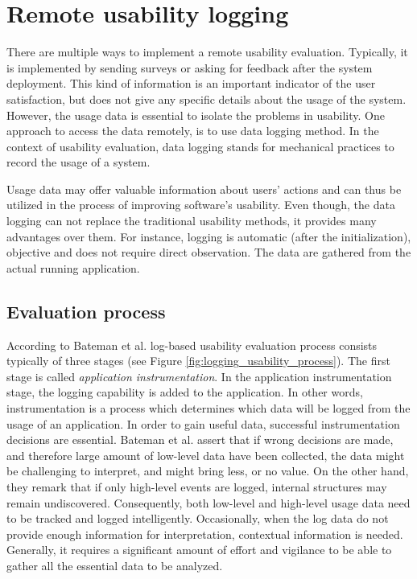\documentclass[12pt,a4paper,oneside,pdftex]{report}
\begin{document}
\section{Remote usability logging}
\label{sec:rue}

There are multiple ways to implement a remote usability evaluation. Typically, it is implemented by sending surveys or asking for feedback after the system deployment. This kind of information is an important indicator of the user satisfaction, but does not give any specific details about the usage of the system. However, the usage data is essential to isolate the problems in usability. One approach to access the data remotely, is to use data logging method. In the context of usability evaluation, data logging stands for mechanical practices to record the usage of a system. \citep{RefWorks:31}

Usage data may offer valuable information about users' actions and can thus be utilized in the process of improving software's usability. Even though, the data logging can not replace the traditional usability methods, it provides many advantages over them. For instance, logging is automatic (after the initialization), objective and does not require direct observation. The data are gathered from the actual running application. \citep{RefWorks:24}	


\subsection{Evaluation process} 

According to Bateman et al. \citep{RefWorks:24} log-based usability evaluation process consists typically of three stages (see Figure \ref{fig:logging_usability_process}). The first stage is called \emph{application instrumentation}. In the application instrumentation stage, the logging capability is added to the application. In other words, instrumentation is a process which determines which data will be logged from the usage of an application. In order to gain useful data, successful instrumentation decisions are essential. Bateman et al. assert that if wrong decisions are made, and therefore large amount of low-level data have been collected, the data might be challenging to interpret, and might bring less, or no value. On the other hand, they remark that if only high-level events are logged, internal structures may remain undiscovered. Consequently, both low-level and high-level usage data need to be tracked and logged intelligently. Occasionally, when the log data do not provide enough information for interpretation, contextual information is needed. Generally, it requires a significant amount of effort and vigilance to be able to gather all the essential data to be analyzed. \citep{RefWorks:24}
\end{document}
